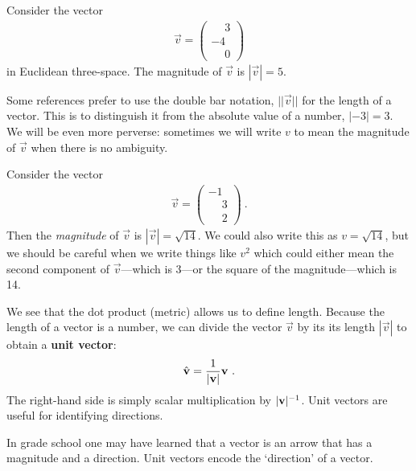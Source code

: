 \documentclass[12pt]{article}
\begin{document}
\begin{example}
Consider the vector
\begin{align}
    \vec{v} = 
    \begin{pmatrix}
    \phantom{+}3\\-4\\\phantom{+}0    
    \end{pmatrix}
\end{align}
in Euclidean three-space. The magnitude of $\vec{v}$ is $|\vec{v}| = 5$.
\end{example}


Some references prefer to use the double bar notation, $||\vec{v}||$ for the length of a vector. This is to distinguish it from the absolute value of a number, $|-3| = 3$. We will be even more perverse: sometimes we will write $v$ to mean the magnitude of $\vec{v}$ when there is no ambiguity.

\begin{example}
Consider the vector
\begin{align}
    \vec{v} = 
    \begin{pmatrix}
    -1\\ \phantom{+}3\\ \phantom{+}2
    \end{pmatrix} \ .
\end{align}
Then the \emph{magnitude} of $\vec{v}$ is $|\vec{v}|=\sqrt{14}$. We could also write this as $v = \sqrt{14}$, but we should be careful when we write things like $v^2$ which could either mean the second component of $\vec{v}$---which is $3$---or the square of the magnitude---which is 14. 
\end{example}


We see that the dot product (metric) allows us to define length. Because the length of a vector is a number, we can divide the vector $\vec{v}$ by its its length $|\vec{v}|$ to obtain a \textbf{unit vector}:
\begin{align}
    {\hat{\mathbf{v}}} = \frac{1}{|\mathbf{v}|}\mathbf{v} \ .
    \label{eq:eg:v:340}
\end{align}
The right-hand side is simply scalar multiplication by $|\mathbf{v}|^{-1}$. Unit vectors are useful for identifying directions.

\begin{example}
In grade school one may have learned that a vector is an arrow that has a magnitude and a direction. Unit vectors encode the `direction' of a vector.
\end{example}
\end{document}
